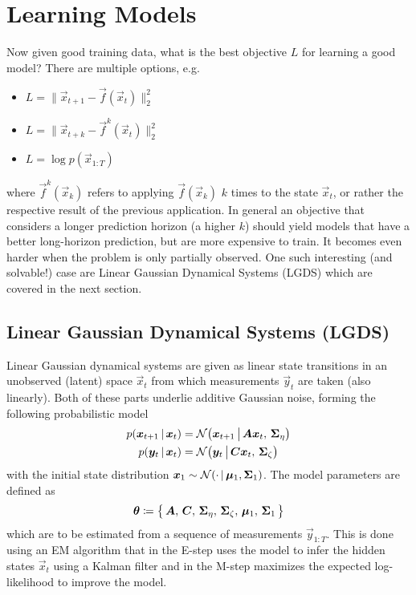 	\section{Learning Models}
		Now given good training data, what is the best objective \(L\) for learning a good model? There are multiple options, e.g.
		\begin{itemize}
			\item {}           \( L = \big\lVert \vec{x}_{t + 1} - \vec{f}(\vec{x}_t) \big\rVert_2^2 \)
			\item {}         \( L = \big\lVert \vec{x}_{t + k} - \vec{f}^k(\vec{x}_t) \big\rVert_2^2 \)
			\item {} \( L = \log p(\vec{x}_{1:T}) \)
		\end{itemize}
		where \( \vec{f}^k(\vec{x}_k) \) refers to applying \( \vec{f}(\vec{x}_k) \) \(k\) times to the state \( \vec{x}_t \), or rather the respective result of the previous application. In general an objective that considers a longer prediction horizon (a higher \(k\)) should yield models that have a better long-horizon prediction, but are more expensive to train. It becomes even harder when the problem is only partially observed. One such interesting (and solvable!) case are Linear Gaussian Dynamical Systems (LGDS) which are covered in the next section.

		\subsection{Linear Gaussian Dynamical Systems (LGDS)}
			\label{subsec:lgds}

			Linear Gaussian dynamical systems are given as linear state transitions in an unobserved (latent) space \(\vec{x}_t\) from which measurements \(\vec{y}_t\) are taken (also linearly). Both of these parts underlie additive Gaussian noise, forming the following probabilistic model
			\begin{align*}
				p(\bm{x}_{t + 1} \,\vert\, \bm{x}_t) &= \mathcal{N}\big( \bm{x}_{t + 1} \,\big\vert\, \bm{A} \bm{x}_t,\, \bm{\Sigma}_\eta \big) \\
				p(\bm{y}_t \,\vert\, \bm{x}_t) &= \mathcal{N}\big( \bm{y}_t \,\big\vert\, \bm{C} \bm{x}_t,\, \bm{\Sigma}_\zeta \big)
			\end{align*}
			with the initial state distribution \( \bm{x}_1 \sim \mathcal{N}(\cdot \,\vert\, \bm{\mu}_1, \bm{\Sigma}_1) \). The model parameters are defined as
			\begin{equation*}
				\bm{\theta} \coloneqq \big\{\, \bm{A},\, \bm{C},\, \bm{\Sigma}_\eta,\, \bm{\Sigma}_\zeta,\, \bm{\mu}_1,\, \bm{\Sigma}_1 \,\big\}
			\end{equation*}
			which are to be estimated from a sequence of measurements \( \vec{y}_{1:T} \). This is done using an EM algorithm that in the E-step uses the model to infer the hidden states \(\vec{x}_t\) using a Kalman filter and in the M-step maximizes the expected log-likelihood to improve the model.

